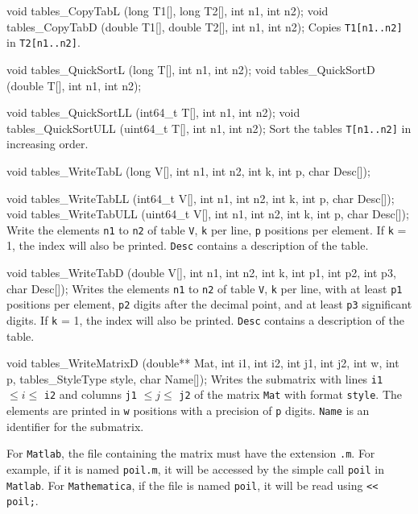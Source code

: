 void tables_CopyTabL (long T1[], long T2[], int n1, int n2);
void tables_CopyTabD (double T1[], double T2[], int n1, int n2);
\endcode
  \tab Copies {\tt T1[n1..n2]} in {\tt T2[n1..n2]}.
  \endtab
\code


void tables_QuickSortL (long T[], int n1, int n2);
void tables_QuickSortD (double T[], int n1, int n2);

void tables_QuickSortLL (int64_t T[], int n1, int n2);
void tables_QuickSortULL (uint64_t T[], int n1, int n2);
\endcode
 \tab Sort the tables {\tt T[n1..n2]} in increasing order.
 \endtab
\code


void tables_WriteTabL (long V[], int n1, int n2, int k, int p, char Desc[]);

void tables_WriteTabLL (int64_t V[], int n1, int n2, int k, int p,
                        char Desc[]);
void tables_WriteTabULL (uint64_t V[], int n1, int n2, int k, int p,
                        char Desc[]);
\endcode
 \tab  Write the elements {\tt n1} to {\tt n2} of table {\tt V},
  {\tt k} per line, {\tt p} positions per element.
  If  {\tt k} = 1, the index will also be printed. {\tt Desc}
  contains a description of the table.
 \endtab
\code


void tables_WriteTabD (double V[], int n1, int n2, int k, int p1, int p2,
                       int p3, char Desc[]);
\endcode
 \tab  Writes the elements {\tt n1} to {\tt n2} of table {\tt V},
  {\tt k} per line, with at least {\tt p1} positions per element,
  {\tt p2} digits after the decimal point, and at least  {\tt p3}
   significant digits.
   If {\tt k} = 1, the index
  will also be printed. {\tt Desc} contains a description of the table.
 \endtab
\code


void tables_WriteMatrixD (double** Mat, int i1, int i2, int j1, int j2,
                          int w, int p, tables_StyleType style,
                          char Name[]);
\endcode
 \tab Writes the submatrix with lines
   {\tt i1} $\le i \le $ {\tt i2} and columns
   {\tt j1} $\le j \le $ {\tt j2} of the matrix {\tt Mat} with format
   {\tt style}. The elements are printed in {\tt w}
   positions with a precision of {\tt p} digits. {\tt Name} is
   an identifier for the submatrix.

   For {\tt Matlab}, the file containing the matrix must have
   the extension {\tt .m}.
   For example, if it is named {\tt poil.m}, it will be accessed by the
   simple call {\tt poil} in {\tt Matlab}.
   For {\tt Mathematica}, if the file is named {\tt poil},
   it will be read using {\tt << poil;}.
 \endtab
\code


